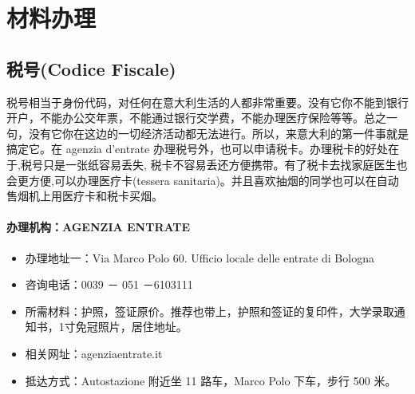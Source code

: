 
% 


\chapter{材料办理}                 %


\section{税号(Codice Fiscale)}
税号相当于身份代码，对任何在意大利生活的人都非常重要。没有它你不能到银行开户，不能办公交年票，不能通过银行交学费，不能办理医疗保险等等。总之一句，没有它你在这边的一切经济活动都无法进行。所以，来意大利的第一件事就是搞定它。在 agenzia d'entrate 办理税号外，也可以申请税卡。办理税卡的好处在于,税号只是一张纸容易丢失, 税卡不容易丢还方便携带。有了税卡去找家庭医生也会更方便,可以办理医疗卡(tessera
sanitaria)。并且喜欢抽烟的同学也可以在自动售烟机上用医疗卡和税卡买烟。

\subsubsection{办理机构：AGENZIA ENTRATE}

\begin{itemize}
\item 办理地址一：Via Marco Polo 60. Ufficio locale delle entrate di Bologna
\item 咨询电话：0039 － 051 －6103111
\item 所需材料：护照，签证原价。推荐也带上，护照和签证的复印件，大学录取通知书，1寸免冠照片，居住地址。
\item 相关网址：agenziaentrate.it
\item 抵达方式：Autostazione 附近坐 11 路车，Marco Polo 下车，步行 500 米。
\end{itemize}

